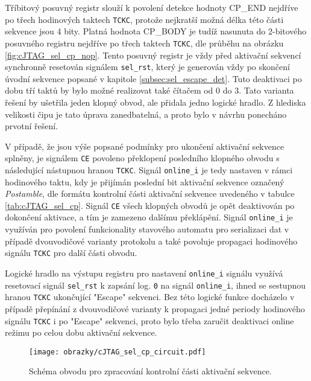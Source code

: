 Tříbitový posuvný registr slouží k povolení detekce hodnoty CP\_END nejdříve po třech hodinových taktech \texttt{\acs{TCKC}}, protože nejkratší možná délka této části sekvence jsou 4 bity. Platná hodnota CP\_BODY je tudíž nasunuta do 2-bitového posuvného registru nejdříve po třech taktech \texttt{\acs{TCKC}}, dle průběhu na obrázku \ref{fig:cJTAG_sel_cp_nop}. Tento posuvný registr je vždy před aktivační sekvencí synchronně resetován signálem \texttt{sel\_rst}, který je generován vždy po skončení úvodní sekvence popsané v kapitole \ref{subsec:sel_escape_det}. Tuto deaktivaci po dobu tří taktů by bylo možné realizovat také čítačem od 0 do 3. Tato varianta řešení by ušetřila jeden klopný obvod, ale přidala jedno logické hradlo. Z hlediska velikosti čipu je tato úprava zanedbatelná, a proto bylo v návrhu ponecháno prvotní řešení.

V případě, že jsou výše popsané podmínky pro ukončení aktivační sekvence splněny, je signálem \texttt{CE} povoleno překlopení posledního klopného obvodu s následující nástupnou hranou \texttt{\acs{TCKC}}. Signál \texttt{online\_i} je tedy nastaven v rámci hodinového taktu, kdy je přijímán poslední bit aktivační sekvence označený \textit{Postamble}, dle formátu kontrolní části aktivační sekvence uvedeného v tabulce \ref{tab:cJTAG_sel_cp}. Signál \texttt{CE} všech klopných obvodů je opět deaktivován po dokončení aktivace, a tím je zamezeno dalšímu překlápění. Signál \texttt{online\_i} je využíván pro povolení funkcionality stavového automatu pro serializaci dat v případě dvouvodičové varianty protokolu a také povoluje propagaci hodinového signálu \texttt{\acs{TCKC}} pro další části obvodu. 

Logické hradlo na výstupu registru pro nastavení \texttt{online\_i} signálu využívá resetovací signál \texttt{sel\_rst} k zapsání log. \texttt{0} na signál \texttt{online\_i}, ihned se sestupnou hranou \texttt{\acs{TCKC}} ukončující "Escape" sekvenci. Bez této logické funkce docházelo v případě přepínání z dvouvodičové varianty k propagaci jedné periody hodinového signálu \texttt{\acs{TCKC}} i po "Escape" sekvenci, proto bylo třeba zaručit deaktivaci online režimu po celou dobu aktivační sekvence.

\begin{figure}[H]
  \begin{center}
    \texttt{[image: obrazky/cJTAG\_sel\_cp\_circuit.pdf]}
  \end{center}
  \caption{Schéma obvodu pro zpracování kontrolní části aktivační sekvence.}
	\label{fig:cJTAG_sel_cp_circuit}
\end{figure}

